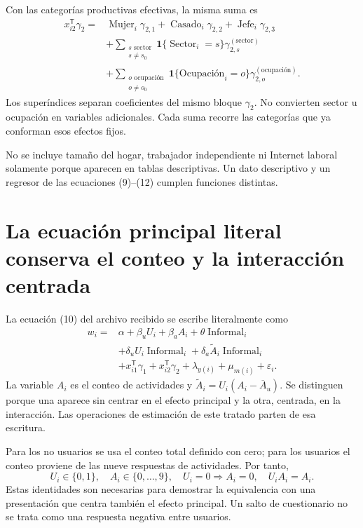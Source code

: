 \documentclass[11pt,a4paper]{article}
\begin{document}
Con las categorías productivas efectivas, la misma suma es
\[
\begin{aligned}
x_{i2}^{\mathsf T}\gamma_2={}&
\operatorname{Mujer}_i\gamma_{2,1}
+\operatorname{Casado}_i\gamma_{2,2}
+\operatorname{Jefe}_i\gamma_{2,3}\\
&+\sum_{\substack{s\text{ sector}\\s\ne s_0}}
\mathbf1\{\operatorname{Sector}_i=s\}\gamma_{2,s}^{(\mathrm{sector})}\\
&+\sum_{\substack{o\text{ ocupación}\\o\ne o_0}}
\mathbf1\{\text{Ocupación}_i=o\}\gamma_{2,o}^{(\text{ocupación})}.
\end{aligned}
\]
Los superíndices separan coeficientes del mismo bloque $\gamma_2$. No convierten sector u ocupación en variables adicionales. Cada suma recorre las categorías que ya conforman esos efectos fijos.

No se incluye tamaño del hogar, trabajador independiente ni Internet laboral solamente porque aparecen en tablas descriptivas. Un dato descriptivo y un regresor de las ecuaciones (9)--(12) cumplen funciones distintas.

\clearpage
\section{La ecuación principal literal conserva el conteo y la interacción centrada}

La ecuación (10) del archivo recibido se escribe literalmente como
\[
\begin{aligned}
w_i={}&\alpha+\beta_uU_i+\beta_aA_i+\theta\operatorname{Informal}_i\\
&+\delta_uU_i\operatorname{Informal}_i
+\delta_a\widetilde A_i\operatorname{Informal}_i\\
&+x_{i1}^{\mathsf T}\gamma_1+x_{i2}^{\mathsf T}\gamma_2
+\lambda_{y(i)}+\mu_{m(i)}+\varepsilon_i.
\end{aligned}\tag{T10}
\]
La variable $A_i$ es el conteo de actividades y $\widetilde A_i=U_i(A_i-\overline A_u)$. Se distinguen porque una aparece sin centrar en el efecto principal y la otra, centrada, en la interacción. Las operaciones de estimación de este tratado parten de esa escritura.

Para los no usuarios se usa el conteo total definido con cero; para los usuarios el conteo proviene de las nueve respuestas de actividades. Por tanto,
\[
U_i\in\{0,1\},\quad A_i\in\{0,\ldots,9\},\quad
U_i=0\Longrightarrow A_i=0,\quad U_iA_i=A_i.
\]
Estas identidades son necesarias para demostrar la equivalencia con una presentación que centra también el efecto principal. Un salto de cuestionario no se trata como una respuesta negativa entre usuarios.
\end{document}
